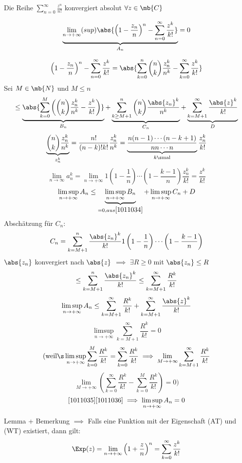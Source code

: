 \begin{Bew}
  Die Reihe $\sum^\infty_{n=0}\frac{z^n}{n!}$ konvergiert absolut $\forall z\in\mb{C}$
\end{Bew}
\begin{Beh}
  \[\underbrace{\lim_{n\to+\infty}(sup)\abs{\left( 1-\frac{z_n}{n} \right)^n-\sum^\infty_{n=0}\frac{z^k}{k!}}}_{A_n}=0\]
\end{Beh}
\begin{Bem}
  \[\left( 1-\frac{z_n}{n} \right)^n-\sum^\infty_{n=0}\frac{z^k}{k!}=\abs{\sum^n_{k=0}\binom{n}{k}\frac{z^k_n}{n^k}-\sum^\infty_{k=0}\frac{z^k}{k!}}\]
  Sei $M\in\mb{N}$ und $M\leq n$
  \[\leq \underbrace{\abs{\sum^M_{k=0}\left( \binom{n}{k}\frac{z^k_n}{n^k}-\frac{z^k}{k!} \right)}}_{B_n}+\underbrace{\sum^n_{k\geq M+1}\binom{n}{k}\frac{\abs{z_n}^k}{n^k}}_{C_n}+\underbrace{\sum^\infty_{k=M+1}\frac{\abs{z}^k}{k!}}_{D}\]
  \[\underbrace{\binom{n}{k}\frac{z^k_n}{n^k}}_{z^k_n}=\frac{n!}{(n-k)!k!}\frac{z^k_n}{n^k}=\underbrace{\frac{n(n-1)\cdots(n-k+1)}{nn\cdots n}}_{k\s\text{mal}}\frac{z^k_n}{k!}\]
  \begin{equation}
    \lim_{n\to\infty}a^k_n=\lim_{n\to+\infty}1\left( 1-\frac{1}{n} \right)\cdots\left( 1-\frac{k-1}{n} \right)\frac{z^k_n}{k!}=\frac{z^k}{k!}
    \label{1011034}
  \end{equation}
  \[\limsup_{n\to+\infty}A_n\leq\underbrace{\limsup_{n\to+\infty}B_n}_{=0, aus \ref{1011034}} + \limsup_{n\to+\infty}C_n+D\]
  Abschätzung für $C_n$:
  \[C_n=\sum^n_{k=M+1}\frac{\abs{z_n}^k}{k!}1\left( 1-\frac{1}{n} \right)\cdots\left( 1-\frac{k-1}{n} \right)\]
  $\abs{z_n}$ konvergiert nach $\abs{z}$ $\implies$ $\exists R\geq 0$ mit $\abs{z_n}\leq R$
  \[\leq\sum^n_{k=M+1}\frac{\abs{z_n}^k}{k!}\leq\sum^\infty_{k=M+1}\frac{R^k}{k!}\]
  \begin{equation}
    \limsup_{n\to+\infty}A_n\leq \sum^\infty_{k=M+1}\frac{R^k}{k!}+\sum^\infty_{k=M+1}\frac{\abs{z}^k}{k!}
    \label{1011035}
  \end{equation}
  \begin{equation}
    \limsup_{n\to+\infty}\sum^\infty_{k=M+1}\frac{R^k}{k!}=0
    \label{1011036}
  \end{equation}
  \[(\text{weil}\s\limsup_{n\to+\infty}\sum^M_{k=0}\frac{R^k}{k!}=\sum^\infty_{k=0}\frac{R^k}{k!}\implies\lim_{M\to+\infty}\sum^\infty_{k=M+1}\frac{R^k}{k!}\]
  \[\lim_{M\to+\infty}\left( \sum^\infty_{k=0}\frac{R^k}{k!}- \sum^M_{k=0}\frac{R^k}{k!}\right)=0)\]
  \[\ref{1011035}\ref{1011036}\implies\limsup_{n\to+\infty}A_n=0\]
\end{Bem}
\begin{Bem}
  Lemma + Bemerkung $\implies$ Falls eine Funktion mit der Eigenschaft (AT) und (WT) existiert, dann gilt:
  \[\Exp(z)=\lim_{n\to+\infty}\left( 1+\frac{z}{n} \right)^n=\sum^\infty_{k=0}\frac{z^k}{k!}\]
\end{Bem}
